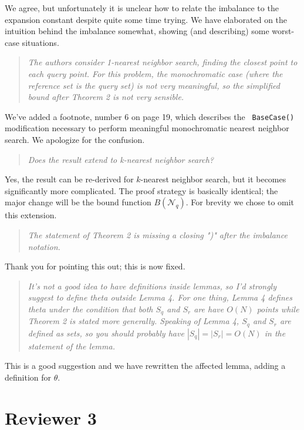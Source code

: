 \documentclass[twoside,11pt]{article}
\begin{document}
We agree, but unfortunately it is unclear how to relate the imbalance to the
expansion constant despite quite some time trying.  We have elaborated on the
intuition behind the imbalance somewhat, showing (and describing) some
worst-case situations.

\begin{quote}{\it
The authors consider 1-nearest neighbor search, finding the closest point to
each query point.  For this problem, the monochromatic case (where the reference
set is the query set) is not very meaningful, so the simplified bound after
Theorem 2 is not very sensible.
}\end{quote}

We've added a footnote, number 6 on page 19, which describes the {\tt
BaseCase()} modification necessary to perform meaningful monochromatic nearest
neighbor search.  We apologize for the confusion.

\begin{quote}{\it
Does the result extend to k-nearest neighbor search?
}\end{quote}

Yes, the result can be re-derived for $k$-nearest neighbor search, but it
becomes significantly more complicated.  The proof strategy is basically
identical; the major change will be the bound function $B(\mathscr{N}_q)$.  For
brevity we chose to omit this extension.

\begin{quote}{\it
The statement of Theorem 2 is missing a closing ")" after the imbalance
notation.
}\end{quote}

Thank you for pointing this out; this is now fixed.

\begin{quote}{\it
It's not a good idea to have definitions inside lemmas, so I'd strongly suggest
to define theta outside Lemma 4.  For one thing, Lemma 4 defines theta under the
condition that both $S_q$ and $S_r$ are have $O(N)$ points while Theorem 2 is
stated more generally.  Speaking of Lemma 4, $S_q$ and $S_r$ are defined as
sets, so you should probably have $|S_q| = |S_r| = O(N)$ in the statement of the
lemma.
}\end{quote}

This is a good suggestion and we have rewritten the affected lemma, adding a
definition for $\theta$.

\section{Reviewer 3}
\end{document}
